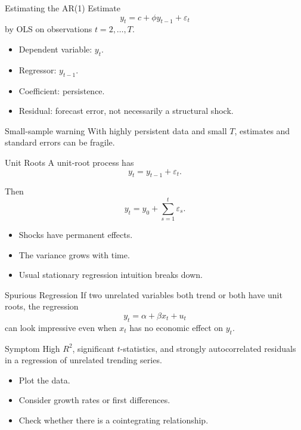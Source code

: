 \documentclass[11pt,aspectratio=169]{beamer}
\newcommand{\derivbutton}[1]{\vspace{0.4em}\hfill\hyperlink{app:#1}{\beamerbutton{Appendix details}}}
\begin{document}
\begin{frame}{Estimating the AR(1)}
  Estimate
  \[
    y_t=c+\phi y_{t-1}+\varepsilon_t
  \]
  by OLS on observations \(t=2,\ldots,T\).

  \begin{itemize}
    \item Dependent variable: \(y_t\).
    \item Regressor: \(y_{t-1}\).
    \item Coefficient: persistence.
    \item Residual: forecast error, not necessarily a structural shock.
  \end{itemize}

  \begin{block}{Small-sample warning}
    With highly persistent data and small \(T\), estimates and standard errors can be fragile.
  \end{block}
\end{frame}

\begin{frame}{Unit Roots}
  A unit-root process has
  \[
    y_t=y_{t-1}+\varepsilon_t.
  \]

  Then
  \[
    y_t=y_0+\sum_{s=1}^{t}\varepsilon_s.
  \]

  \begin{itemize}
    \item Shocks have permanent effects.
    \item The variance grows with time.
    \item Usual stationary regression intuition breaks down.
  \end{itemize}
\end{frame}

\begin{frame}{Spurious Regression}
  \hypertarget{main:spurious}{}
  If two unrelated variables both trend or both have unit roots, the regression
  \[
    y_t=\alpha+\beta x_t+u_t
  \]
  can look impressive even when \(x_t\) has no economic effect on \(y_t\).

  \begin{block}{Symptom}
    High \(R^2\), significant \(t\)-statistics, and strongly autocorrelated residuals in a regression of unrelated trending series.
  \end{block}

  \begin{itemize}
    \item Plot the data.
    \item Consider growth rates or first differences.
    \item Check whether there is a cointegrating relationship.
  \end{itemize}
  \derivbutton{spurious}
\end{frame}
\end{document}
